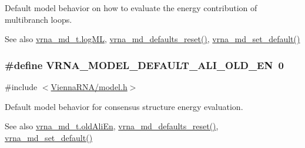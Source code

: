 Default model behavior on how to evaluate the energy contribution of multibranch loops. 

\begin{DoxySeeAlso}{See also}
\hyperlink{group__model__details_ae259f89a94acae0c7f1412603e7f57b5}{vrna\+\_\+md\+\_\+t.\+log\+ML}, \hyperlink{group__model__details_ga70834424cf804d149937de89f80ceb45}{vrna\+\_\+md\+\_\+defaults\+\_\+reset()}, \hyperlink{group__model__details_ga8ac6ff84936282436f822644bf841f66}{vrna\+\_\+md\+\_\+set\+\_\+default()} 
\end{DoxySeeAlso}
\subsubsection[{\texorpdfstring{V\+R\+N\+A\+\_\+\+M\+O\+D\+E\+L\+\_\+\+D\+E\+F\+A\+U\+L\+T\+\_\+\+A\+L\+I\+\_\+\+O\+L\+D\+\_\+\+EN}{VRNA_MODEL_DEFAULT_ALI_OLD_EN}}]{\setlength{\rightskip}{0pt plus 5cm}\#define V\+R\+N\+A\+\_\+\+M\+O\+D\+E\+L\+\_\+\+D\+E\+F\+A\+U\+L\+T\+\_\+\+A\+L\+I\+\_\+\+O\+L\+D\+\_\+\+EN~0}\hypertarget{group__model__details_ga2a5bbfc1edf33077e39466d2d9807115}{}\label{group__model__details_ga2a5bbfc1edf33077e39466d2d9807115}


{\ttfamily \#include $<$\hyperlink{model_8h}{Vienna\+R\+N\+A/model.\+h}$>$}



Default model behavior for consensus structure energy evaluation. 

\begin{DoxySeeAlso}{See also}
\hyperlink{group__model__details_ab53aec4503130877973c6111ae6f0f76}{vrna\+\_\+md\+\_\+t.\+old\+Ali\+En}, \hyperlink{group__model__details_ga70834424cf804d149937de89f80ceb45}{vrna\+\_\+md\+\_\+defaults\+\_\+reset()}, \hyperlink{group__model__details_ga8ac6ff84936282436f822644bf841f66}{vrna\+\_\+md\+\_\+set\+\_\+default()} 
\end{DoxySeeAlso}

